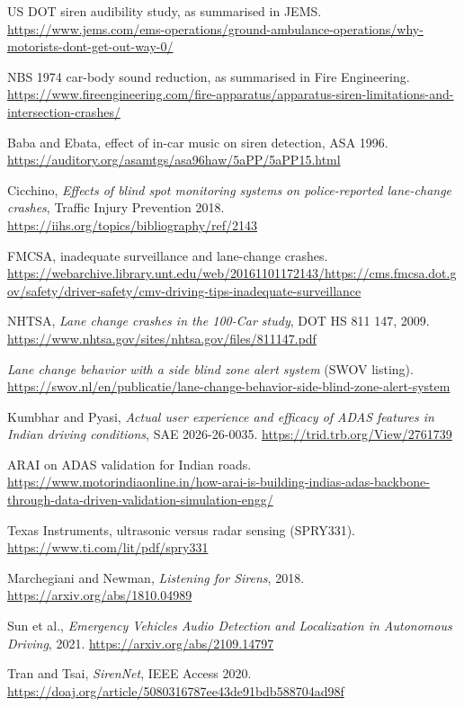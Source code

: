 \documentclass[11pt]{article}
\begin{document}
{\begin{description}[leftmargin=1.2cm,style=nextline,itemsep=2pt]
\item[R11] US DOT siren audibility study, as summarised in JEMS. \url{https://www.jems.com/ems-operations/ground-ambulance-operations/why-motorists-dont-get-out-way-0/}
\item[R12] NBS 1974 car-body sound reduction, as summarised in Fire Engineering. \url{https://www.fireengineering.com/fire-apparatus/apparatus-siren-limitations-and-intersection-crashes/}
\item[R13] Baba and Ebata, effect of in-car music on siren detection, ASA 1996. \url{https://auditory.org/asamtgs/asa96haw/5aPP/5aPP15.html}
\item[R14] Cicchino, \emph{Effects of blind spot monitoring systems on police-reported lane-change crashes}, Traffic Injury Prevention 2018. \url{https://iihs.org/topics/bibliography/ref/2143}
\item[R15] FMCSA, inadequate surveillance and lane-change crashes. \url{https://webarchive.library.unt.edu/web/20161101172143/https://cms.fmcsa.dot.gov/safety/driver-safety/cmv-driving-tips-inadequate-surveillance}
\item[R16] NHTSA, \emph{Lane change crashes in the 100-Car study}, DOT HS 811 147, 2009. \url{https://www.nhtsa.gov/sites/nhtsa.gov/files/811147.pdf}
\item[R17] \emph{Lane change behavior with a side blind zone alert system} (SWOV listing). \url{https://swov.nl/en/publicatie/lane-change-behavior-side-blind-zone-alert-system}
\item[R18] Kumbhar and Pyasi, \emph{Actual user experience and efficacy of ADAS features in Indian driving conditions}, SAE 2026-26-0035. \url{https://trid.trb.org/View/2761739}
\item[R19] ARAI on ADAS validation for Indian roads. \url{https://www.motorindiaonline.in/how-arai-is-building-indias-adas-backbone-through-data-driven-validation-simulation-engg/}
\item[R20] Texas Instruments, ultrasonic versus radar sensing (SPRY331). \url{https://www.ti.com/lit/pdf/spry331}
\item[R21] Marchegiani and Newman, \emph{Listening for Sirens}, 2018. \url{https://arxiv.org/abs/1810.04989}
\item[R22] Sun et al., \emph{Emergency Vehicles Audio Detection and Localization in Autonomous Driving}, 2021. \url{https://arxiv.org/abs/2109.14797}
\item[R23] Tran and Tsai, \emph{SirenNet}, IEEE Access 2020. \url{https://doaj.org/article/5080316787ee43de91bdb588704ad98f}

\end{description}}
\end{document}
